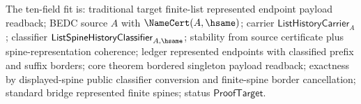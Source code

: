 The ten-field fit is: traditional target finite-list represented endpoint
payload readback; BEDC source $A$ with $\NameCert(A,\hsame)$; carrier
$\mathsf{ListHistoryCarrier}_A$; classifier
$\mathsf{ListSpineHistoryClassifier}_{A,\hsame}$; stability from source
certificate plus spine-representation coherence; ledger represented endpoints
with classified prefix and suffix borders; core theorem bordered singleton
payload readback; exactness by displayed-spine public classifier conversion and
finite-spine border cancellation; standard bridge represented finite spines;
status $\mathsf{ProofTarget}$.
